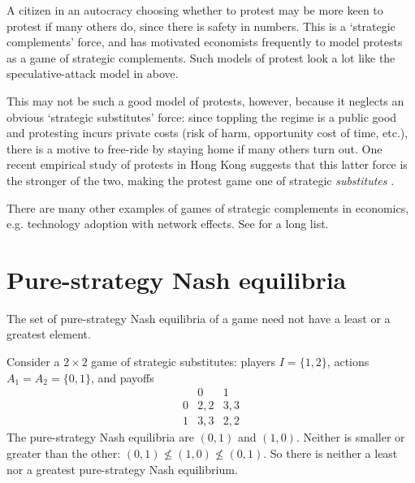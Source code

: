 \begin{example}
	\label{example:protest}
	A citizen in an autocracy choosing whether to protest may be more keen to protest if many others do, since there is safety in numbers. This is a `strategic complements' force, and has motivated economists frequently to model protests as a game of strategic complements. Such models of protest look a lot like the speculative-attack model in  above.

	This may not be such a good model of protests, however, because it neglects an obvious `strategic substitutes' force: since toppling the regime is a public good and protesting incurs private costs (risk of harm, opportunity cost of time, etc.), there is a motive to free-ride by staying home if many others turn out. One recent empirical study of protests in Hong Kong suggests that this latter force is the stronger of the two, making the protest game one of strategic \emph{substitutes} \parencite{CantoniYangYuchtmanZhang2019}. 
\end{example}

There are many other examples of games of strategic complements in economics, e.g. technology adoption with network effects. See \textcite{MilgromRoberts1990} for a long list.



\section{Pure-strategy Nash equilibria}
\label{spm:nash}

The set of pure-strategy Nash equilibria of a game need not have a least or a greatest element.

\begin{example}
	\label{example:2x2_subst}
	Consider a $2 \times 2$ game of strategic substitutes: players $I=\{1,2\}$, actions $A_1 = A_2 = \{0,1\}$, and payoffs
	\begin{equation*}
		\begin{array}{c|cc}
			  & 0   & 1 \\ \hline
			0 & 2,2 & 3,3 \\
			1 & 3,3 & 2,2
		\end{array}
	\end{equation*}
	The pure-strategy Nash equilibria are $(0,1)$ and $(1,0)$. Neither is smaller or greater than the other: $(0,1) \nleq (1,0) \nleq (0,1)$. So there is neither a least nor a greatest pure-strategy Nash equilibrium.
\end{example}

